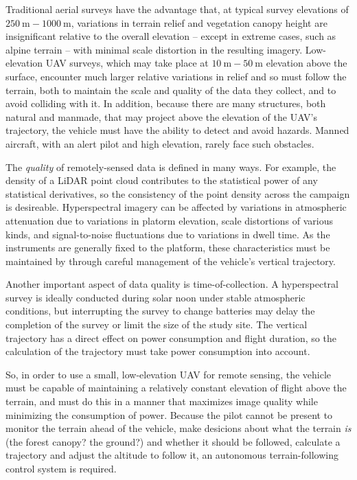 \documentclass[10pt]{article}
\begin{document}
Traditional aerial surveys have the advantage that, at typical survey elevations of $\SI{250}\m-\SI{1000}\m$, variations in terrain relief and vegetation canopy height are insignificant relative to the overall elevation -- except in extreme cases, such as alpine terrain -- with minimal scale distortion in the resulting imagery. Low-elevation UAV surveys, which may take place at $\SI{10}\m-\SI{50}\m$ elevation above the surface, encounter much larger relative variations in relief and so must follow the terrain, both to maintain the scale and quality of the data they collect, and to avoid colliding with it. In addition, because there are many structures, both natural and manmade, that may project above the elevation of the UAV's trajectory, the vehicle must have the ability to detect and avoid hazards. Manned aircraft, with an alert pilot and high elevation, rarely face such obstacles.

The \emph{quality} of remotely-sensed data is defined in many ways. For example, the density of a LiDAR point cloud contributes to the statistical power of any statistical derivatives, so the consistency of the point density across the campaign is desireable. Hyperspectral imagery can be affected by variations in atmospheric attenuation due to variations in platorm elevation, scale distortions of various kinds, and signal-to-noise fluctuations due to variations in dwell time. As the instruments are generally fixed to the platform, these characteristics must be maintained by through careful management of the vehicle's vertical trajectory.

Another important aspect of data quality is time-of-collection. A hyperspectral survey is ideally conducted during solar noon under stable atmospheric conditions, but interrupting the survey to change batteries may delay the completion of the survey or limit the size of the study site. The vertical trajectory has a direct effect on power consumption and flight duration, so the calculation of the trajectory must take power consumption into account.

So, in order to use a small, low-elevation UAV for remote sensing, the vehicle must be capable of maintaining a relatively constant elevation of flight above the terrain, and must do this in a manner that maximizes image quality while minimizing the consumption of power. Because the pilot cannot be present to monitor the terrain ahead of the vehicle, make desicions about what the terrain \emph{is} (the forest canopy? the ground?) and whether it should be followed, calculate a trajectory and adjust the altitude to follow it, an autonomous terrain-following control system is required.
\end{document}
